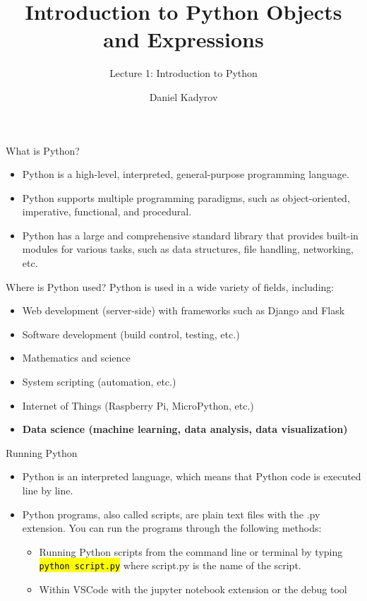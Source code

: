 \documentclass[
    aspectratio=169, 
    usepdftitle=false, 
    xcolor={dvipsnames},
    hyperref={
        colorlinks,
        linkcolor=black,
        urlcolor=blue}
    ]{beamer}
\title[Introduction to Python]{Introduction to Python Objects and Expressions}
\subtitle{Lecture 1: Introduction to Python}
\author{Daniel Kadyrov}
\date{}
\let\OldTexttt\texttt
\renewcommand{\texttt}[1]{\OldTexttt{\hl{#1}}}%
\begin{document}
\begin{frame}
    \titlepage
\end{frame}

\begin{frame}{What is Python?}
    \begin{itemize}
        \item Python is a high-level, interpreted, general-purpose programming language.
        \item Python supports multiple programming paradigms, such as object-oriented, imperative, functional, and procedural.
        \item Python has a large and comprehensive standard library that provides built-in modules for various tasks, such as data structures, file handling, networking, etc.
    \end{itemize}
\end{frame}

\begin{frame}{Where is Python used?}
    Python is used in a wide variety of fields, including:
    \begin{itemize}
        \item Web development (server-side) with frameworks such as Django and Flask
        \item Software development (build control, testing, etc.)
        \item Mathematics and science
        \item System scripting (automation, etc.)
        \item Internet of Things (Raspberry Pi, MicroPython, etc.)
        \item \textbf{Data science (machine learning, data analysis, data visualization)}
    \end{itemize}
\end{frame}

\begin{frame}{Running Python}
    \begin{itemize}
        \item Python is an interpreted language, which means that Python code is executed line by line.
        \item Python programs, also called scripts, are plain text files with the .py extension. You can run the programs through the following methods:
              \begin{itemize}
                  \item Running Python scripts from the command line or terminal by typing \texttt{python script.py} where script.py is the name of the script.
                  \item Within VSCode with the jupyter notebook extension or the debug tool
              \end{itemize}
    \end{itemize}
\end{frame}
\end{document}
